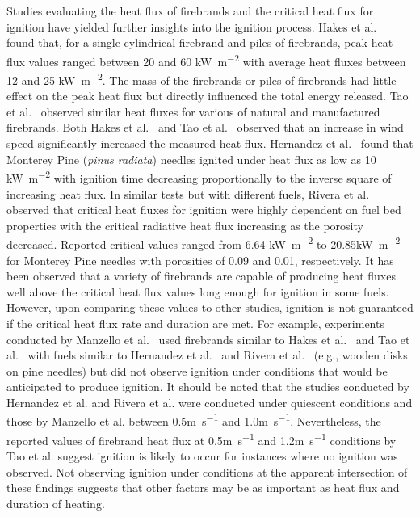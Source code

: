     Studies evaluating the heat flux of firebrands and the critical heat flux for ignition have yielded further insights into the ignition process. Hakes et al.~\cite{Hakes2019a} found that, for a single cylindrical firebrand and piles of firebrands, peak heat flux values ranged between 20 and 60 \si{\kilo\watt\per\square\meter} with average heat fluxes between 12 and 25 \si{\kilo\watt\per\square\meter}. The mass of the firebrands or piles of firebrands had little effect on the peak heat flux but directly influenced the total energy released. Tao et al.~\cite{Tao2020} observed similar heat fluxes for various of natural and manufactured firebrands. Both Hakes et al.~\cite{Hakes2019a} and Tao et al.~\cite{Tao2020} observed that an increase in wind speed significantly increased the measured heat flux. Hernandez et al.~\cite{Hernandez2018} found that Monterey Pine (\textit{pinus radiata}) needles ignited under heat flux as low as 10 \si{\kilo\watt\per\square\meter} with ignition time decreasing proportionally to the inverse square of increasing heat flux. In similar tests but with different fuels, Rivera et al.~\cite{Rivera2020} observed that critical heat fluxes for ignition were highly dependent on fuel bed properties with the critical radiative heat flux increasing as the porosity decreased. Reported critical values ranged from 6.64 \si{\kilo\watt\per\square\meter} to 20.85\si{\kilo\watt\per\square\meter} for Monterey Pine needles with porosities of 0.09 and 0.01, respectively. It has been observed that a variety of firebrands are capable of producing heat fluxes well above the critical heat flux values long enough for ignition in some fuels. However, upon comparing these values to other studies, ignition is not guaranteed if the critical heat flux rate and duration are met. For example, experiments conducted by Manzello et al.~\cite{Manzello2008} used firebrands similar to Hakes et al.~\cite{Hakes2019a} and Tao et al.~\cite{Tao2020} with fuels similar to Hernandez et al.~\cite{Hernandez2018} and Rivera et al.~\cite{Rivera2020} (e.g., wooden disks on pine needles) but did not observe ignition under conditions that would be anticipated to produce ignition. It should be noted that the studies conducted by Hernandez et al. and Rivera et al. were conducted under quiescent conditions and those by Manzello et al. between 0.5\si{\meter\per\second} and 1.0\si{\meter\per\second}. Nevertheless, the reported values of firebrand heat flux at 0.5\si{\meter\per\second} and 1.2\si{\meter\per\second} conditions by Tao et al. suggest ignition is likely to occur for instances where no ignition was observed. Not observing ignition under conditions at the apparent intersection of these findings suggests that other factors may be as important as heat flux and duration of heating. 

